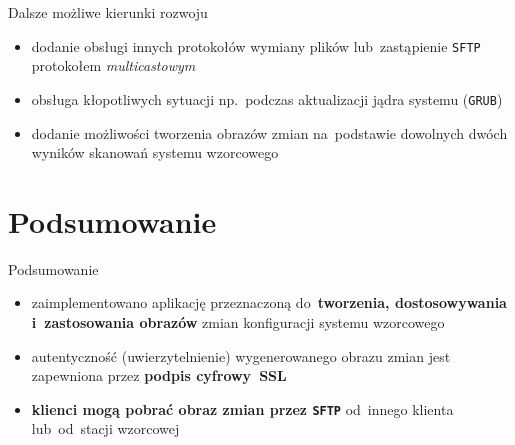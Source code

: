 \documentclass[notes,polish,xcolor=dvipsnames,aspectratio=169]{beamer}
\begin{document}
\begin{frame}{Dalsze możliwe kierunki rozwoju}

\begin{itemize}
	\item dodanie obsługi innych protokołów wymiany plików lub~zastąpienie \texttt{SFTP} protokołem \emph{multicastowym}
	\item obsługa kłopotliwych sytuacji np.~podczas aktualizacji jądra systemu (\texttt{GRUB})
	\item dodanie możliwości tworzenia obrazów zmian na~podstawie dowolnych dwóch wyników skanowań systemu wzorcowego
\end{itemize}

\end{frame}


\section{Podsumowanie}

\begin{frame}{Podsumowanie}

\begin{itemize}
	\item zaimplementowano aplikację przeznaczoną do~\textbf{tworzenia, dostosowywania i~zastosowania obrazów} zmian konfiguracji systemu wzorcowego
	\item autentyczność (uwierzytelnienie) wygenerowanego obrazu zmian jest zapewniona przez \textbf{podpis cyfrowy~SSL}
	\item \textbf{klienci mogą pobrać obraz zmian przez \texttt{SFTP}} od~innego klienta lub~od~stacji wzorcowej
\end{itemize}

\end{frame}

\end{document}
